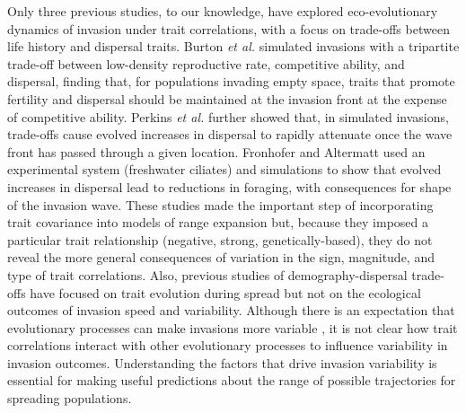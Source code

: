 \documentclass[11pt]{article}
\begin{document}
Only three previous studies, to our knowledge, have explored eco-evolutionary dynamics of invasion under trait correlations, with a focus on trade-offs between life history and dispersal traits.
Burton \textit{et al.} \citeyearpar{burton_trade-offs_2010} simulated invasions with a tripartite trade-off between low-density reproductive rate, competitive ability, and dispersal, finding that, for populations invading empty space, traits that promote fertility and dispersal should be maintained at the invasion front at the expense of competitive ability.
Perkins \textit{et al.} \citeyearpar{perkins_after_2016} further showed that, in simulated invasions, trade-offs cause evolved increases in dispersal to rapidly attenuate once the wave front has passed through a given location.
Fronhofer and Altermatt \citeyearpar{fronhofer_eco-evolutionary_2015} used an experimental system (freshwater ciliates) and simulations to show that evolved increases in dispersal lead to reductions in foraging, with consequences for shape of the invasion wave.
These studies made the important step of incorporating trait covariance into models of range expansion but, because they imposed a particular trait relationship (negative, strong, genetically-based), they do not reveal the more general consequences of variation in the sign, magnitude, and type of trait correlations.
Also, previous studies of demography-dispersal trade-offs have focused on trait evolution during spread but not on the ecological outcomes of invasion speed and variability.
Although there is an expectation that evolutionary processes can make invasions more variable \citep{williams2019evolution}, it is not clear how trait correlations interact with other evolutionary processes to influence variability in invasion outcomes.
Understanding the factors that drive invasion variability is essential for making useful predictions about the range of possible trajectories for spreading populations.
\end{document}
